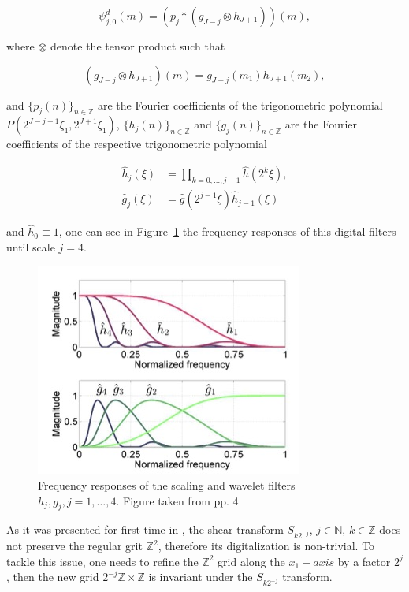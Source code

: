 \begin{equation}
\label{eq:LFshearlets5}
\psi^d_{j,0}(m)=(p_j\ast(g_{J-j}\otimes h_{J+1}))(m),
\end{equation}

where $\otimes$ denote the tensor product such that 

$$
(g_{J-j}\otimes h_{J+1})(m)=g_{J-j}(m_1)h_{J+1}(m_2),
$$

and $\{p_j(n)\}_{n\in\mathbb{Z}}$ are the Fourier coefficients of the trigonometric polynomial $P(2^{J-j-1}\xi_1,2^{J+1}\xi_1)$, $\{ h_j(n)\}_{n\in\mathbb{Z}}$ and $\{g_j(n)\}_{n\in\mathbb{Z}}$ are the Fourier coefficients of the respective trigonometric polynomial

$$
\begin{aligned}
\hat{h}_j(\xi)&=\prod_{k=0,\ldots,j-1}\hat{h}(2^k\xi),\\
\hat{g}_j(\xi)&=\hat{g}(2^{j-1}\xi)\hat{h}_{j-1}(\xi)
\end{aligned}
$$

and $\hat{h}_0\equiv 1$, one can see in Figure~\ref{fig:magnitude_response} the frequency responses of this digital filters until scale $j=4$. 

\begin{figure}[h!]
\centering
\includegraphics[width = 0.7 \textwidth]{./Diagrams/magnitude_response.jpg}
\caption{Frequency responses of the scaling and wavelet filters $h_j,g_j,j=1,\ldots,4$. Figure taken from \cite{LF-Shearlets} pp. 4}
\label{fig:magnitude_response}
\end{figure}

As it was presented for first time in \cite{Nonseparableshear}, the shear transform $S_{k2^{-j}}$, $j\in\mathbb{N}$, $k\in\mathbb{Z}$ does not preserve the regular grit $\mathbb{Z}^2$, therefore its digitalization is non-trivial. To tackle this issue, one needs to refine the $\mathbb{Z}^2$ grid along the $x_1-axis$ by a factor $2^j$, then the new grid $2^{-j}\mathbb{Z}\times\mathbb{Z}$ is invariant under the $S_{k 2^{-j}}$ transform. 

